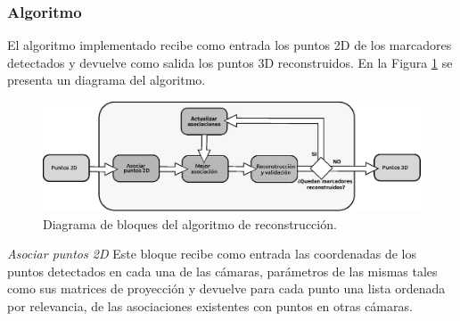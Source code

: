 \subsubsection{Algoritmo}
El algoritmo implementado recibe como entrada los puntos 2D de los marcadores detectados y devuelve como salida los puntos 3D reconstruidos. 
En la Figura \ref{fig: diagrama algoritmo} se presenta un diagrama del algoritmo.
\begin{figure}
    \begin{center}
        \includegraphics[scale=0.45]{./imagenes/Reconstruccion/bloques_reconstruccion}
        \caption{Diagrama de bloques del algoritmo de reconstrucción.}
        \label{fig: diagrama algoritmo}
    \end{center}
\end{figure}
\textit{Asociar puntos 2D}\label{seccion_asociar2D_uno}
%
Este bloque recibe como entrada las coordenadas de los puntos detectados en cada una de las cámaras, parámetros de las mismas tales como sus matrices de proyección y devuelve para cada punto una lista ordenada por relevancia, de las asociaciones existentes con puntos en otras cámaras.\\ 
